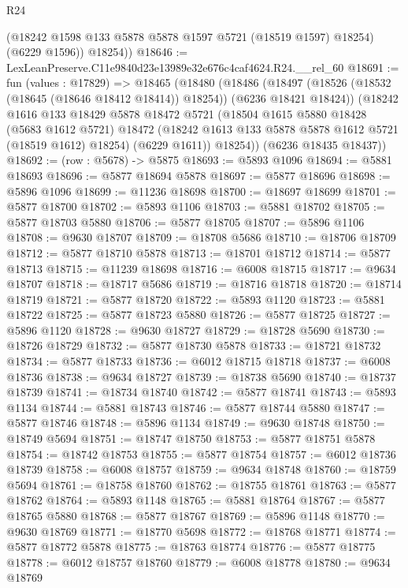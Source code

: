 \begin{lexlean}{R24}
\begin{coremodule}
          (@18242 @1598 @133 @5878 @5878 @1597 @5721 (@18519 @1597) @18254)
          (@6229 @1596))
        @18254))
@18646 := LexLeanPreserve.C11e9840d23e13989e32e676c4caf4624.R24.__rel_60
@18691 := fun (values : @17829) =>
  @18465
    (@18480
      (@18486
        (@18497 (@18526 (@18532 (@18645 (@18646 @18412 @18414)) @18254)) (@6236 @18421 @18424))
        (@18242
          @1616
          @133
          @18429
          @5878
          @18472
          @5721
          (@18504
            @1615
            @5880
            @18428
            (@5683 @1612 @5721)
            @18472
            (@18242 @1613 @133 @5878 @5878 @1612 @5721 (@18519 @1612) @18254)
            (@6229 @1611))
          @18254))
      (@6236 @18435 @18437))
@18692 := (row : @5678) -> @5875
@18693 := @5893 @1096
@18694 := @5881 @18693
@18696 := @5877 @18694 @5878
@18697 := @5877 @18696
@18698 := @5896 @1096
@18699 := @11236 @18698
@18700 := @18697 @18699
@18701 := @5877 @18700
@18702 := @5893 @1106
@18703 := @5881 @18702
@18705 := @5877 @18703 @5880
@18706 := @5877 @18705
@18707 := @5896 @1106
@18708 := @9630 @18707
@18709 := @18708 @5686
@18710 := @18706 @18709
@18712 := @5877 @18710 @5878
@18713 := @18701 @18712
@18714 := @5877 @18713
@18715 := @11239 @18698
@18716 := @6008 @18715
@18717 := @9634 @18707
@18718 := @18717 @5686
@18719 := @18716 @18718
@18720 := @18714 @18719
@18721 := @5877 @18720
@18722 := @5893 @1120
@18723 := @5881 @18722
@18725 := @5877 @18723 @5880
@18726 := @5877 @18725
@18727 := @5896 @1120
@18728 := @9630 @18727
@18729 := @18728 @5690
@18730 := @18726 @18729
@18732 := @5877 @18730 @5878
@18733 := @18721 @18732
@18734 := @5877 @18733
@18736 := @6012 @18715 @18718
@18737 := @6008 @18736
@18738 := @9634 @18727
@18739 := @18738 @5690
@18740 := @18737 @18739
@18741 := @18734 @18740
@18742 := @5877 @18741
@18743 := @5893 @1134
@18744 := @5881 @18743
@18746 := @5877 @18744 @5880
@18747 := @5877 @18746
@18748 := @5896 @1134
@18749 := @9630 @18748
@18750 := @18749 @5694
@18751 := @18747 @18750
@18753 := @5877 @18751 @5878
@18754 := @18742 @18753
@18755 := @5877 @18754
@18757 := @6012 @18736 @18739
@18758 := @6008 @18757
@18759 := @9634 @18748
@18760 := @18759 @5694
@18761 := @18758 @18760
@18762 := @18755 @18761
@18763 := @5877 @18762
@18764 := @5893 @1148
@18765 := @5881 @18764
@18767 := @5877 @18765 @5880
@18768 := @5877 @18767
@18769 := @5896 @1148
@18770 := @9630 @18769
@18771 := @18770 @5698
@18772 := @18768 @18771
@18774 := @5877 @18772 @5878
@18775 := @18763 @18774
@18776 := @5877 @18775
@18778 := @6012 @18757 @18760
@18779 := @6008 @18778
@18780 := @9634 @18769

\end{coremodule}
\end{lexlean}
